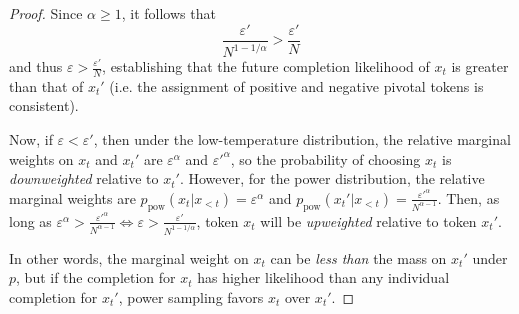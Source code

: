 \documentclass{article}
\begin{document}
\begin{proof}
Since $\alpha \geq 1$, it follows that \begin{equation}
    \frac{\varepsilon'}{N^{1 - 1/\alpha}} > \frac{\varepsilon'}{N}
\end{equation}
and thus $\varepsilon > \frac{\varepsilon'}{N}$, establishing that the future completion likelihood of $x_t$ is greater than that of $x_t'$ (i.e. the assignment of positive and negative pivotal tokens is consistent).

Now, if $\varepsilon < \varepsilon'$, then under the low-temperature distribution, the relative marginal weights on $x_t$ and $x_t'$ are $\varepsilon^{\alpha}$ and $\varepsilon'^{\alpha}$, so the probability of choosing $x_t$ is \textit{downweighted} relative to $x_t'$. However, for the power distribution, the relative marginal weights are $p_{\text{pow}}(x_t | x_{<t}) = \varepsilon^{\alpha}$ and $p_{\text{pow}}(x_t' | x_{<t}) = \frac{\varepsilon'^{\alpha}}{N^{\alpha - 1}}$. Then, as long as $\varepsilon^{\alpha} > \frac{\varepsilon'^{\alpha}}{N^{\alpha - 1}} \iff \varepsilon > \frac{\varepsilon'}{N^{1 - 1/{\alpha}}}$, token $x_t$ will be \textit{upweighted} relative to token $x_t'$. 

In other words, the marginal weight on $x_t$ can be \textit{less than} the mass on $x_t'$ under $p$, but if the completion for $x_t$ has higher likelihood than any individual completion for $x_t'$, power sampling favors $x_t$ over $x_t'$.\end{proof}
\end{document}
